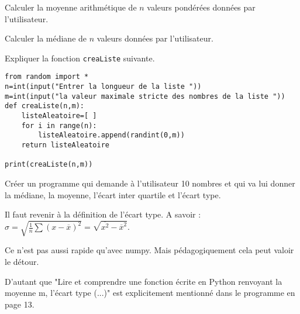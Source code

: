 \begin{ExD} 

Calculer la moyenne arithmétique de $n$ valeurs pondérées données par l'utilisateur.
\end{ExD}

\begin{ExD} 

Calculer la médiane de $n$ valeurs données par l'utilisateur.
\end{ExD}

\newpage



\begin{titre}

\end{titre}
 
 
\begin{ExD} 

Expliquer la fonction \texttt{creaListe} suivante.

\begin{lstlisting}
from random import *
n=int(input("Entrer la longueur de la liste "))
m=int(input("la valeur maximale stricte des nombres de la liste "))
def creaListe(n,m):
    listeAleatoire=[ ]
    for i in range(n):
        listeAleatoire.append(randint(0,m))
    return listeAleatoire
    
print(creaListe(n,m))

\end{lstlisting}

\end{ExD}

\begin{ExD} 

Créer un programme qui demande à l'utilisateur 10 nombres et qui va lui donner la médiane, la moyenne, l'écart inter quartile et l'écart type.

\end{ExD} 



Il faut revenir à la définition de l'écart type. A savoir : $\sigma = \sqrt{\frac{1}{n}\sum(x-\overline{x})^2} = \sqrt{\overline{x^2}-\overline{x}^2}$.

Ce n'est pas aussi rapide qu'avec numpy. Mais pédagogiquement cela peut valoir le détour.

D'autant que "Lire et comprendre une fonction écrite en Python renvoyant la moyenne m, l’écart type (...)" est explicitement mentionné dans le programme en page 13.
  
 \begin{Cod}
 
 \end{Cod}

 
